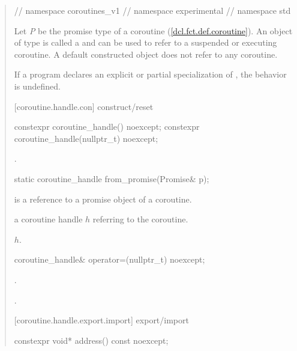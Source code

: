 \begin{quote}
\begin{codeblock}
{{{} // namespace coroutines_v1
} // namespace experimental
} // namespace std
\end{codeblock}

\pnum
Let \textit{P} be the promise type of a coroutine (\ref{dcl.fct.def.coroutine}). An object of type  is called a 
and can be used to refer to a suspended or executing coroutine.
A default constructed  object does not refer to any coroutine.

\pnum If a program declares an explicit or partial specialization of , the behavior is undefined.



[coroutine.handle.con]{ construct/reset}
\begin{itemdecl}
  constexpr coroutine_handle() noexcept;		
  constexpr coroutine_handle(nullptr_t) noexcept;
\end{itemdecl}
\begin{itemdescr}
  \pnum\postconditions {}.
\end{itemdescr}

\begin{itemdecl}
  static coroutine_handle from_promise(Promise& p);
\end{itemdecl}
\begin{itemdescr}
  \pnum
  \precondition {} is a reference to a promise object of a coroutine.
  
	\pnum
  \returns a coroutine handle $h$ referring to the coroutine.
  
  \pnum\postconditions {}$h$.
\end{itemdescr}

\begin{itemdecl}
  coroutine_handle& operator=(nullptr_t) noexcept;
\end{itemdecl}
\begin{itemdescr}
	\pnum\postconditions {}.
  
  \pnum\returns {}.
\end{itemdescr}

[coroutine.handle.export.import]{ export/import}

\begin{itemdecl}
  constexpr void* address() const noexcept;
\end{itemdecl}


\end{quote}
